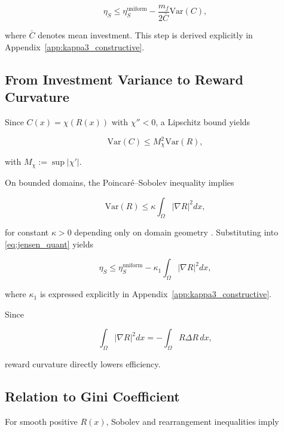 \documentclass[12pt,a4paper]{article}
\theoremstyle{definition}
\begin{document}
\begin{equation}
  \eta_S
  \le
  \eta_S^{\mathrm{uniform}}
  -
  \frac{m_f}{2\bar C}
  \mathrm{Var}(C),
  \label{eq:jensen_quant}
\end{equation}

where $\bar C$ denotes mean investment.
This step is derived explicitly in
Appendix~\ref{app:kappa3_constructive}.

\subsection{From Investment Variance to Reward Curvature}

Since $C(x)=\chi(R(x))$ with $\chi''<0$,
a Lipschitz bound yields

\begin{equation}
  \mathrm{Var}(C)
  \le
  M_\chi^2 \mathrm{Var}(R),
\end{equation}

with $M_\chi := \sup |\chi'|$.

On bounded domains,
the Poincaré–Sobolev inequality implies

\begin{equation}
  \mathrm{Var}(R)
  \le
  \kappa
  \int_\Omega |\nabla R|^2 dx,
\end{equation}

for constant $\kappa>0$ depending only on domain geometry
\citep{lieb2001}.
Substituting into \eqref{eq:jensen_quant} yields

\begin{equation}
  \eta_S
  \le
  \eta_S^{\mathrm{uniform}}
  -
  \kappa_1
  \int_\Omega |\nabla R|^2 dx,
  \label{eq:eta_penalty}
\end{equation}

where $\kappa_1$ is expressed explicitly in
Appendix~\ref{app:kappa3_constructive}.

Since

\begin{equation}
  \int_\Omega |\nabla R|^2 dx
  =
  -\int_\Omega R \Delta R \, dx,
\end{equation}

reward curvature directly lowers efficiency.

\subsection{Relation to Gini Coefficient}

For smooth positive $R(x)$,
Sobolev and rearrangement inequalities imply
\end{document}
